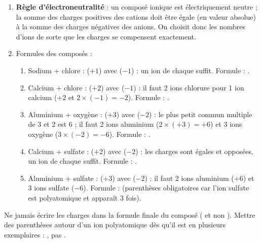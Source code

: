 \documentclass[11pt]{article}
\begin{document}
\begin{corrige}
\begin{enumerate}
\item \textbf{Règle d'électroneutralité} : un composé ionique est électriquement neutre ; la somme des charges positives des cations doit être égale (en valeur absolue) à la somme des charges négatives des anions. On choisit donc les nombres d'ions de sorte que les charges se compensent exactement.
\item Formules des composés :
\begin{enumerate}
\item Sodium + chlore :  ($+1$) avec  ($-1$) : un ion de chaque suffit. Formule : .
\item Calcium + chlore :  ($+2$) avec  ($-1$) : il faut 2 ions chlorure pour 1 ion calcium ($+2$ et $2 \times (-1) = -2$). Formule : .
\item Aluminium + oxygène :  ($+3$) avec  ($-2$) : le plus petit commun multiple de 3 et 2 est 6 ; il faut 2 ions aluminium ($2 \times (+3) = +6$) et 3 ions oxygène ($3 \times (-2) = -6$). Formule : .
\item Calcium + sulfate :  ($+2$) avec  ($-2$) : les charges sont égales et opposées, un ion de chaque suffit. Formule : .
\item Aluminium + sulfate :  ($+3$) avec  ($-2$) : il faut 2 ions aluminium ($+6$) et 3 ions sulfate ($-6$). Formule :  (parenthèses obligatoires car l'ion sulfate est polyatomique et apparaît 3 fois).
\end{enumerate}
\end{enumerate}
\end{corrige}

\begin{attention}
Ne jamais écrire les charges dans la formule finale du composé ( et non ). Mettre des parenthèses autour d'un ion polyatomique dès qu'il est en plusieurs exemplaires : , pas .
\end{attention}
\end{document}
